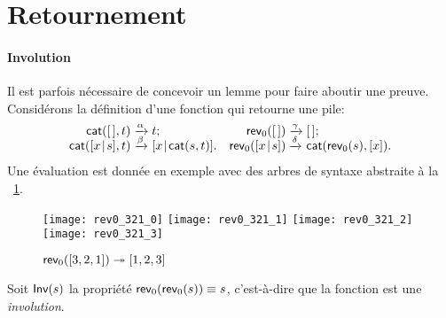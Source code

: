 \section{Retournement}
\label{sec:reversal}

\paragraph{Involution}

Il est parfois nécessaire de concevoir un lemme pour faire aboutir une
preuve. Considérons la définition d'une fonction
\label{def:rev0}
qui retourne une pile:
\begin{equation*}
\begin{array}{@{}r@{\;}l@{\;}lr@{\;}l@{\;}l@{}}
  \fun{cat}(\el,t)\index{cat@\fun{cat/2}}
& \xrightarrow{\smash{\alpha}} & t;
& \fun{rev}_0(\el)
& \xrightarrow{\smash{\gamma}} & \el;\\
  \fun{cat}(\cons{x}{s},t)
& \xrightarrow{\smash{\beta}} & \cons{x}{\fun{cat}(s,t)}.
& \fun{rev}_0(\cons{x}{s})
& \xrightarrow{\smash{\delta}} & \fun{cat}(\fun{rev}_0(s),[x]).
\end{array}
\end{equation*}
Une évaluation est donnée en exemple avec des arbres de syntaxe
abstraite à la \fig~\ref{fig:rev0_321}.
\begin{figure}
\centering
\texttt{[image: rev0\_321\_0]}
\texttt{[image: rev0\_321\_1]}
\texttt{[image: rev0\_321\_2]}
\texttt{[image: rev0\_321\_3]}
\caption{\(\textsf{rev}_0([3,2,1]) \twoheadrightarrow [1,2,3]\)}
\label{fig:rev0_321}
\end{figure}
Soit \(\textsf{Inv}({s})\) la propriété
\(\textsf{rev}_0(\textsf{rev}_0(s)) \equiv s\), c'est-à-dire que la fonction
 est une
\emph{involution}.

